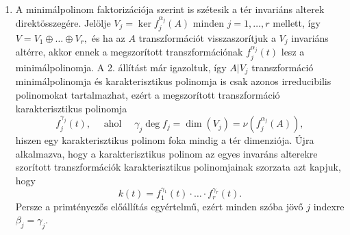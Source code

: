 \documentclass[a4paper, showtrims]{memoir}
\makeatletter
\renewenvironment{proof}[1][\proofname]
    {\par\pushQED{\qed}%
    \normalfont \topsep6\p@\@plus6\p@\relax
    \trivlist
    \item[\hskip\labelsep
        \itshape
    #1\@addpunct{:}]\ignorespaces}
    {\popQED\endtrivlist\@endpefalse}
\theoremstyle{plain}
\theoremstyle{remark}
\theoremstyle{definition}
\makeatother
\begin{document}
\begin{proof}
\begin{enumerate}
        \item
    A minimálpolinom faktorizációja szerint is szétesik a tér invariáns alterek direktösszegére.
    Jelölje 
    $
    V_j=\ker f_j^{\alpha_j}\left( A \right)
    $ minden $j=1,\ldots,r$ mellett,
    így 
    \begin{math}
        V
        =
        V_1\oplus\ldots\oplus V_r,
    \end{math}
    és ha az $A$ transzformációt visszaszorítjuk a $V_j$ invariáns altérre,
    akkor ennek a megszorított transzformációnak $f_j^{\alpha_j}\left( t \right)$ 
    lesz a minimálpolinomja.
    A 2. állítást már igazoltuk, így $A|V_j$ transzformáció minimálpolinomja
    és karakterisztikus polinomja is csak azonos irreducibilis polinomokat tartalmazhat, 
    ezért a megszorított transzformáció karakterisztikus polinomja
    \[
        f_j^{\gamma_j}\left( t \right),
        \quad\text{ ahol }\quad
        \gamma_j\deg f_j
        =
        \dim\left( V_j \right)
        =
        \nu\left( f_j^{\alpha_j}\left( A \right) \right),
    \]
    hiszen egy karakterisztikus polinom foka mindig a tér dimenziója.
    Újra alkalmazva, hogy a karakterisztikus polinom az egyes invaráns alterekre szorított transzformációk karakterisztikus polinomjainak szorzata azt kapjuk, hogy
    \[
        k\left( t \right)
        =
        f_1^{\gamma_1}\left( t \right)
        \cdot\ldots\cdot
        f_r^{\gamma_r}\left( t \right).
    \]
    Persze a primtényezős előállítás egyértelmű, ezért minden szóba jövő $j$ indexre
    $\beta_j=\gamma_j$.
    \qedhere
    \end{enumerate}
\end{proof}
\end{document}

